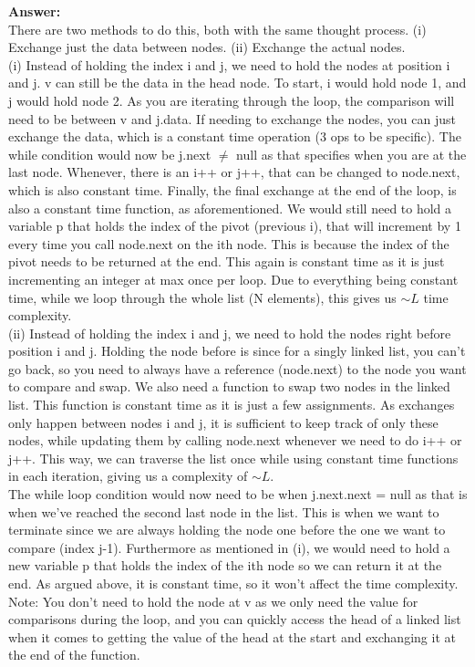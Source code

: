 \begin{problem}
\begin{questions}
\textbf{Answer:}\\
There are two methods to do this, both with the same thought process. (i) Exchange just the data between nodes. (ii) Exchange the actual nodes.\\

(i) Instead of holding the index i and j, we need to hold the nodes at position i and j. v can still be the data in the head node. To start, i would hold node 1, and j would hold node 2. As you are iterating through the loop, the comparison will need to be between v and j.data. If needing to exchange the nodes, you can just exchange the data, which is a constant time operation (3 ops to be specific). The while condition would now be j.next $\neq$ null as that specifies when you are at the last node. Whenever, there is an i++ or j++, that can be changed to node.next, which is also constant time. Finally, the final exchange at the end of the loop, is also a constant time function, as aforementioned. We would still need to hold a variable p that holds the index of the pivot (previous i), that will increment by 1 every time you call node.next on the ith node. This is because the index of the pivot needs to be returned at the end. This again is constant time as it is just incrementing an integer at max once per loop. Due to everything being constant time, while we loop through the whole list (N elements), this gives us $\sim L$ time complexity.\\

(ii) Instead of holding the index i and j, we need to hold the nodes right before position i and j. Holding the node before is since for a singly linked list, you can't go back, so you need to always have a reference (node.next) to the node you want to compare and swap. We also need a function to swap two nodes in the linked list. This function is constant time as it is just a few assignments. As exchanges only happen between nodes i and j, it is sufficient to keep track of only these nodes, while updating them by calling node.next whenever we need to do i++ or j++. This way, we can traverse the list once while using constant time functions in each iteration, giving us a complexity of $\sim L$.\\

The while loop condition would now need to be when j.next.next = null as that is when we've reached the second last node in the list. This is when we want to terminate since we are always holding the node one before the one we want to compare (index j-1). Furthermore as mentioned in (i), we would need to hold a new variable p that holds the index of the ith node so we can return it at the end. As argued above, it is constant time, so it won't affect the time complexity.\\

Note: You don't need to hold the node at v as we only need the value for comparisons during the loop, and you can quickly access the head of a linked list when it comes to getting the value of the head at the start and exchanging it at the end of the function.
\end{questions}
\end{problem}

